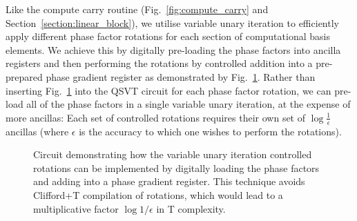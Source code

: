 \documentclass[aps,prx,twocolumn,floatfix,10pt,amssymb,amsfont,amsmath,superscriptaddress,float,nofootinbib,longbibliography,nobalancelastpage]{revtex4-2}
\theoremstyle{empty}
\begin{document}
Like the compute carry routine (Fig.~\ref{fig:compute_carry} and Section~\ref{section:linear_block}), we utilise variable unary iteration \cite{Sanders_2020} to efficiently apply different phase factor rotations for each section of computational basis elements. We achieve this by digitally pre-loading the phase factors into ancilla registers and then performing the rotations by controlled addition into a pre-prepared phase gradient register \cite{gidneyHalvingCostQuantum2018} as demonstrated by Fig.~\ref{fig:phase-gradient}. Rather than inserting Fig.~\ref{fig:phase-gradient} into the QSVT circuit for each phase factor rotation, we can pre-load all of the phase factors in a single variable unary iteration, at the expense of more ancillas: Each set of controlled rotations requires their own set of $\log \frac{1}{\epsilon}$ ancillas (where $\epsilon$ is the accuracy to which one wishes to perform the rotations). %
\begin{figure}
\caption{\label{fig:phase-gradient} Circuit demonstrating how the variable unary iteration controlled rotations can be implemented by digitally loading the phase factors and adding into a phase gradient register. This technique avoids Clifford+T compilation of rotations\cite{Bocharov_2015}, which would lead to a multiplicative factor $\log 1/\epsilon$ in T complexity.}
\end{figure}
\end{document}
